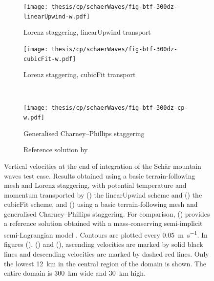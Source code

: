 \begin{figure}
	\centering
	\begin{subfigure}{0.55\textwidth}
		\centering
		\caption{Lorenz staggering, linearUpwind transport}
		\label{fig:cp:schaerWaves:w:linearUpwind}
		\texttt{[image: thesis/cp/schaerWaves/fig-btf-300dz-linearUpwind-w.pdf]}
	\end{subfigure}
	\begin{subfigure}{0.44\textwidth}
		\centering
		\caption{Lorenz staggering, cubicFit transport}
		\label{fig:cp:schaerWaves:w:cubicFit}
		\texttt{[image: thesis/cp/schaerWaves/fig-btf-300dz-cubicFit-w.pdf]}
	\end{subfigure}
	\\
	\vspace*{1em}
	\begin{subfigure}{0.55\textwidth}
		\centering
		\caption{Generalised Charney--Phillips staggering}
		\label{fig:cp:schaerWaves:w:cp}
		\texttt{[image: thesis/cp/schaerWaves/fig-btf-300dz-cp-w.pdf]}
	\end{subfigure}
	\begin{subfigure}{0.44\textwidth}
		\centering
		\caption{Reference solution by \citet{melvin2010}}
		\label{fig:cp:schaerWaves:w:melvin}
	\end{subfigure}
	\caption{Vertical velocities at the end of integration of the Sch\"{a}r mountain waves test case.
	Results obtained using a basic terrain-following mesh and Lorenz staggering, with potential temperature and momentum transported by () the linearUpwind scheme and
	() the cubicFit scheme, and () using a basic terrain-following mesh and generalised Charney--Phillips staggering.
	For comparison, () provides a reference solution obtained with a mass-conserving semi-implicit semi-Lagrangian model \citep{melvin2010}.
	Contours are plotted every \SI{0.05}{\meter\per\second}.  In figures (), () and (), ascending velocities are marked by solid black lines and descending velocities are marked by dashed red lines.
Only the lowest \SI{12}{\kilo\meter} in the central region of the domain is shown.  The entire domain is \SI{300}{\kilo\meter} wide and \SI{30}{\kilo\meter} high.
	}
	\label{fig:cp:schaerWaves:w}
\end{figure}


